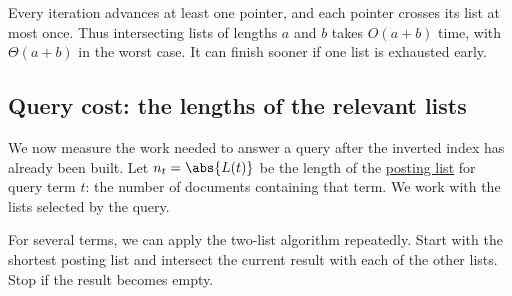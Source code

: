 \documentclass[a4paper,12pt,oneside]{report}
\begin{document}
Every iteration advances at least one pointer, and each pointer
crosses its list at most once. Thus intersecting lists of lengths
$a$ and $b$ takes $O(a+b)$ time, with $\Theta(a+b)$ in the worst case.
It can finish sooner if one list is exhausted early.

\subsection{Query cost: the lengths of the relevant lists}

We now measure the work needed to answer a query after the inverted
index has already been built. Let $n_t=\abs{L(t)}$ be the length of
the \hyperref[def:inverted-index]{posting list} for query term $t$:
the number of documents containing that term. We work with the lists
selected by the query.

For several terms, we can apply the two-list algorithm repeatedly.
Start with the shortest posting list and intersect the current
result with each of the other lists. Stop if the result becomes empty.
\end{document}
